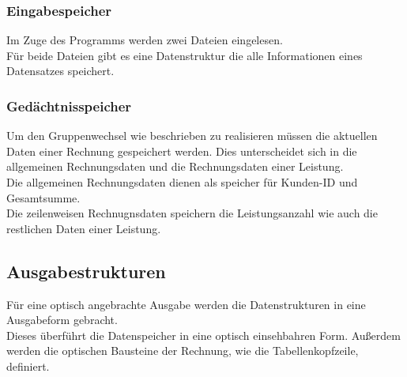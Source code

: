 \subsubsection{Eingabespeicher}\label{subsubsubsec:eingabespeicher}
Im Zuge des Programms werden zwei Dateien eingelesen.\\
Für beide Dateien gibt es eine Datenstruktur die alle Informationen eines Datensatzes speichert.\\

\subsubsection{Gedächtnisspeicher}\label{subsubsubsubsec:gedaechtnisspeicher}
Um den Gruppenwechsel wie beschrieben zu realisieren müssen die aktuellen Daten einer Rechnung gespeichert werden. Dies unterscheidet sich in die allgemeinen Rechnungsdaten und die Rechnungsdaten einer Leistung.\\
Die allgemeinen Rechnungsdaten dienen als speicher für Kunden-ID und Gesamtsumme.\\
Die zeilenweisen Rechnugnsdaten speichern die Leistungsanzahl wie auch die restlichen Daten einer Leistung.\\

\subsection{Ausgabestrukturen}\label{subsubsec:ausgabestrukturen}
Für eine optisch angebrachte Ausgabe werden die Datenstrukturen in eine Ausgabeform gebracht.\\
Dieses überführt die Datenspeicher in eine optisch einsehbahren Form. Außerdem werden die optischen Bausteine der Rechnung, wie die Tabellenkopfzeile, definiert.\\